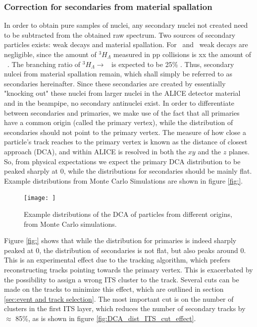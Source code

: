 

\subsubsection{Correction for secondaries from material spallation}
In order to obtain pure samples of nuclei, any secondary nuclei not created need to be subtracted from the obtained raw spectrum. Two sources of secondary particles exists: weak decays and material spallation. For \ahe\ and \atrit\, weak decays are negligible, since the amount of $^3H_\Lambda$ measured in pp collisions is xx the amount of \ahe\ \cite{}. The branching ratio of $^3H_\Lambda \rightarrow $ \ahe\ is expected to be 25\% \cite{PDG}. Thus, secondary nulcei from material spallation remain, which shall simply be referred to as secondaries hereinafter. Since these secondaries are created by essentially "knocking out" these nuclei from larger nuclei in the ALICE detector material and in the beampipe, no secondary antinuclei exist. In order to differentiate between secondaries and primaries, we make use of the fact that all primaries have a common origin (called the primary vertex), while the distribution of secondaries should not point to the primary vertex. The measure of how close a particle's track reaches to the primary vertex is known as the distance of closest approach (DCA), and within ALICE is resolved in both the $xy$ and the $z$ planes. So, from physical expectations we expect the primary DCA distribution to be peaked sharply at 0, while the distributions for secondaries should be mainly flat. Example distributions from Monte Carlo Simulations are shown in figure \ref{fig:}.

\begin{figure}
    \centering
    \texttt{[image: ]}
    \caption{Example distributions of the DCA of particles from different origins, from Monte Carlo simulations. }
    \label{fig:ExampleDCADistributions}
\end{figure}

Figure \ref{fig:} shows that while the distribution for primaries is indeed sharply peaked at 0, the distribution of secondaries is not flat, but also peaks around 0. This is an experimental effect due to the tracking algorithm, which prefers reconstructing tracks pointing towards the primary vertex. This is exacerbated by the possibility to assign a wrong ITS cluster to the track. Several cuts can be made on the tracks to minimize this effect, which are outlined in section \ref{sec:event and track selection}. The most important cut is on the number of clusters in the first ITS layer, which reduces the number of secondary tracks by $\approx$ 85\%, as is shown in figure \ref{fig:DCA_dist_ITS_cut_effect}. 
\\

